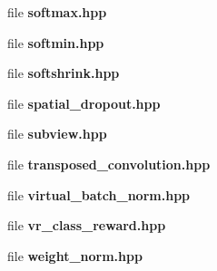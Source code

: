 \begin{DoxyCompactItemize}
file \textbf{ softmax.\+hpp}
\item 
file \textbf{ softmin.\+hpp}
\item 
file \textbf{ softshrink.\+hpp}
\item 
file \textbf{ spatial\+\_\+dropout.\+hpp}
\item 
file \textbf{ subview.\+hpp}
\item 
file \textbf{ transposed\+\_\+convolution.\+hpp}
\item 
file \textbf{ virtual\+\_\+batch\+\_\+norm.\+hpp}
\item 
file \textbf{ vr\+\_\+class\+\_\+reward.\+hpp}
\item 
file \textbf{ weight\+\_\+norm.\+hpp}
\end{DoxyCompactItemize}
